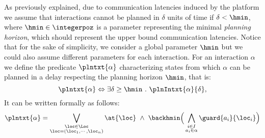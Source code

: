 As previously explained, due to communication latencies induced by the platform we assume that interactions cannot be planned in $\delta$ units of time if $\delta < \hmin$, where $\hmin \in \integerpoz$ is a parameter representing the minimal \emph{planning horizon}, which should represent the upper bound communication latencies.
Notice that for the sake of simplicity, we consider a global parameter $\hmin$ but we could also assume different parameters for each interaction.
For an interaction $\alpha$ we define the predicate $\plntxt{\alpha}$ characterizing states from which $\alpha$ can be planned in a delay respecting the planning horizon $\hmin$, that is:
\begin{displaymath}
\plntxt{\alpha} \Leftrightarrow \exists \delta \geq \hmin \ . \ \plnIntxt{\alpha}{\delta},
\end{displaymath}
It can be written formally as follows:
\begin{equation}\label{eq:pln}
  \plntxt{\alpha} = \bigvee_{\substack{\loc\in\Loc\\\loc=(\loc_1,\cdots,\loc_n)}}\at{\loc} \ \wedge \ \backhmin \Big(\bigwedge_{\substack{i\in I\\a_i\in\alpha}}\guard{a_i}{\loc_i}\Big)
\end{equation}

